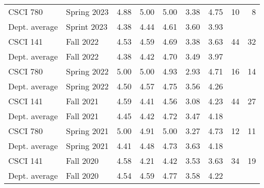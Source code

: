 {\begin{center}
\begin{tabular}{llrrrrrrr}
CSCI 780      & Spring 2023 & 4.88  & 5.00  & 5.00  & 3.38  & 4.75  & 10 &  8\\
Dept. average & Sprint 2023 & 4.38  & 4.44  & 4.61  & 3.60  & 3.93  &    &    \\
\hline

CSCI 141      & Fall 2022 & 4.53  & 4.59  & 4.69  & 3.38  & 3.63  & 44 &  32\\
Dept. average & Fall 2022 & 4.38  & 4.42  & 4.70  & 3.49  & 3.97  &    &    \\
\hline

CSCI 780      & Spring 2022 & 5.00  & 5.00  & 4.93  & 2.93  & 4.71  & 16 &  14\\
Dept. average & Spring 2022 & 4.50  & 4.57  & 4.75  & 3.56  & 4.26  &    &    \\
\hline

CSCI 141      & Fall 2021   & 4.59  & 4.41  & 4.56  & 3.08  & 4.23  & 44 &  27\\
Dept. average & Fall 2021   & 4.45  & 4.42  & 4.72  & 3.47  & 4.18  &    &  \\
\hline

CSCI 780      & Spring 2021 & 5.00  & 4.91  & 5.00  & 3.27  & 4.73  & 12 &  11\\
Dept. average & Spring 2021 & 4.41  & 4.48  & 4.73  & 3.63  & 4.18  &    &    \\
\hline

CSCI 141      & Fall 2020   & 4.58  & 4.21  & 4.42  & 3.53  & 3.63  & 34 &  19\\
Dept. average & Fall 2020   & 4.54  & 4.59  & 4.77  & 3.58  & 4.22  &    &    
\end{tabular}
\end{center}
}

\vspace{4mm}

\vspace{-0.3cm}

